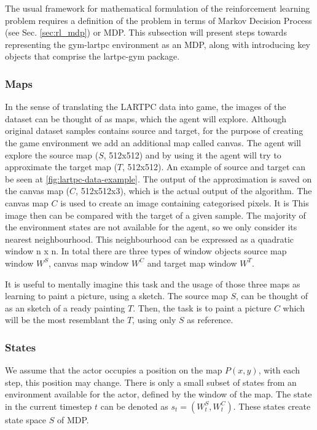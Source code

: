 The usual framework for mathematical formulation of the reinforcement learning problem requires a definition of the problem in terms of Markov Decision Process (see Sec. \ref{sec:rl_mdp}) or MDP.
This subsection will present steps towards representing the gym-lartpc environment as an MDP, along with introducing key objects that comprise the lartpc-gym package.

\subsubsection{Maps}

In the sense of translating the LARTPC data into game, the images of the dataset can be thought of as maps, which the agent will explore.
Although original dataset samples contains source and target, for the purpose of creating the game environment we add an additional map called canvas.
The agent will explore the source map ($S$, 512x512) and by using it the agent will try to approximate the target map ($T$, 512x512). An example of source and target can be seen at \ref{fig:lartpc-data-example}. The output of the approximation is saved on the canvas map ($C$, 512x512x3), which is the actual output of the algorithm.
The canvas map $C$ is used to create an image containing categorised pixels. 
It is 
This image then can be compared with the target of a given sample.
The majority of the environment states are not available for the agent, so we only consider its nearest neighbourhood.
This neighbourhood can be expressed as a quadratic window n x n.
In total there are three types of window objects source map window $W^{S}$, canvas map window $W^{C}$ and target map window $W^{T}$.

It is useful to mentally imagine this task and the usage of those three maps as learning to paint a picture, using a sketch.
The source map $S$, can be thought of as an sketch of a ready painting $T$. Then, the task is to paint a picture $C$ which will be the most resemblant the $T$, using only $S$ as reference.

\subsubsection{States}


We assume that the actor occupies a position on the map $P(x,y)$, with each step, this position may change.
There is only a small subset of states from an environment available for the actor, defined by the window of the map. The state in the current timestep $t$ can be denoted as $s_{t}=(W^{S}_{t}, W^{C}_{t})$. These states create state space $S$ of MDP.

